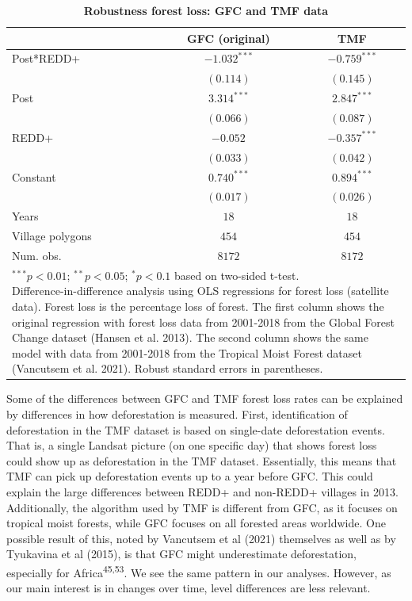 \documentclass[
]{article}
\begin{document}
\begin{table}[h]
\caption{\textbf{Robustness forest loss: GFC and TMF data}}
\begin{center}
\begin{tabular}{l c c}
\hline
 & GFC (original) & TMF \\
\hline
Post*REDD+       & $-1.032^{***}$ & $-0.759^{***}$ \\
                 & $(0.114)$      & $(0.145)$      \\
Post             & $3.314^{***}$  & $2.847^{***}$  \\
                 & $(0.066)$      & $(0.087)$      \\
REDD+            & $-0.052$       & $-0.357^{***}$ \\
                 & $(0.033)$      & $(0.042)$      \\
Constant         & $0.740^{***}$  & $0.894^{***}$  \\
                 & $(0.017)$      & $(0.026)$      \\
\hline
Years            & $18$           & $18$           \\
Village polygons & $454$          & $454$          \\
Num. obs.        & $8172$         & $8172$         \\
\hline
\multicolumn{3}{l}{\scriptsize{\parbox{.5\linewidth}{\vspace{2pt}$^{***}p<0.01$; $^{**}p<0.05$; $^{*}p<0.1$ based on two-sided t-test.\\
       Difference-in-difference analysis using OLS regressions for forest loss (satellite data). Forest loss is the percentage loss of forest. The first column shows the original regression with forest loss data from 2001-2018 from the Global Forest Change dataset (Hansen et al. 2013). The second column shows the same model with data from 2001-2018 from the Tropical Moist Forest dataset (Vancutsem et al. 2021). Robust standard errors in parentheses.}}}
\end{tabular}
\label{table:coefficients}
\end{center}
\end{table}

Some of the differences between GFC and TMF forest loss rates can be
explained by differences in how deforestation is measured. First,
identification of deforestation in the TMF dataset is based on
single-date deforestation events. That is, a single Landsat picture (on
one specific day) that shows forest loss could show up as deforestation
in the TMF dataset. Essentially, this means that TMF can pick up
deforestation events up to a year before GFC. This could explain the
large differences between REDD+ and non-REDD+ villages in 2013.
Additionally, the algorithm used by TMF is different from GFC, as it
focuses on tropical moist forests, while GFC focuses on all forested
areas worldwide. One possible result of this, noted by Vancutsem et al
(2021) themselves as well as by Tyukavina et al (2015), is that GFC
might underestimate deforestation, especially for
Africa\textsuperscript{45,53}. We see the same pattern in our analyses.
However, as our main interest is in changes over time, level differences
are less relevant.
\end{document}
